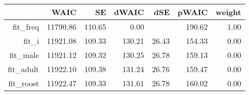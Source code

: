 \begin{table}[ht]
\centering
\begin{tabular}{rrrrrrr}
  \hline
 & WAIC & SE & dWAIC & dSE & pWAIC & weight \\ 
  \hline
fit\_freq & 11790.86 & 110.65 & 0.00 &  & 190.62 & 1.00 \\ 
  fit\_i & 11921.08 & 109.33 & 130.21 & 26.43 & 154.33 & 0.00 \\ 
  fit\_male & 11921.12 & 109.32 & 130.25 & 26.78 & 159.13 & 0.00 \\ 
  fit\_adult & 11922.10 & 109.38 & 131.24 & 26.76 & 159.47 & 0.00 \\ 
  fit\_roost & 11922.47 & 109.33 & 131.61 & 26.78 & 160.02 & 0.00 \\ 
   \hline
\end{tabular}
\end{table}
